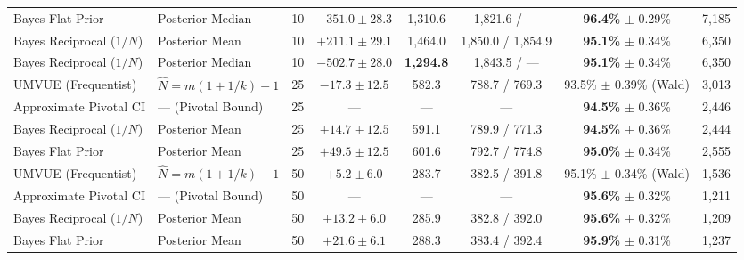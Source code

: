 \documentclass[10pt,a4paper]{article}
\begin{document}
\begin{table}[H]
{\begin{tabular}{llcccccc}
Bayes Flat Prior          & Posterior Median           & 10 & $-351.0 \pm 28.3$ & 1,310.6 & 1,821.6 / ---     & \textbf{96.4\%} $\pm$ 0.29\% & 7,185 \\
Bayes Reciprocal ($1/N$)  & Posterior Mean             & 10 & $+211.1 \pm 29.1$ & 1,464.0 & 1,850.0 / 1,854.9 & \textbf{95.1\%} $\pm$ 0.34\% & 6,350 \\
Bayes Reciprocal ($1/N$)  & Posterior Median           & 10 & $-502.7 \pm 28.0$ & \textbf{1,294.8} & 1,843.5 / ---     & \textbf{95.1\%} $\pm$ 0.34\% & 6,350 \\
\midrule
UMVUE (Frequentist)       & $\hat{N} = m(1 + 1/k) - 1$ & 25 & $-17.3 \pm 12.5$  & 582.3   & 788.7 / 769.3     & 93.5\% $\pm$ 0.39\% (Wald) & 3,013 \\
Approximate Pivotal CI    & --- (Pivotal Bound)        & 25 & ---               & ---     & ---               & \textbf{94.5\%} $\pm$ 0.36\% & 2,446 \\
Bayes Reciprocal ($1/N$)  & Posterior Mean             & 25 & $+14.7 \pm 12.5$  & 591.1   & 789.9 / 771.3     & \textbf{94.5\%} $\pm$ 0.36\% & 2,444 \\
Bayes Flat Prior          & Posterior Mean             & 25 & $+49.5 \pm 12.5$  & 601.6   & 792.7 / 774.8     & \textbf{95.0\%} $\pm$ 0.34\% & 2,555 \\
\midrule
UMVUE (Frequentist)       & $\hat{N} = m(1 + 1/k) - 1$ & 50 & $+5.2 \pm 6.0$    & 283.7   & 382.5 / 391.8     & 95.1\% $\pm$ 0.34\% (Wald) & 1,536 \\
Approximate Pivotal CI    & --- (Pivotal Bound)        & 50 & ---               & ---     & ---               & \textbf{95.6\%} $\pm$ 0.32\% & 1,211 \\
Bayes Reciprocal ($1/N$)  & Posterior Mean             & 50 & $+13.2 \pm 6.0$   & 285.9   & 382.8 / 392.0     & \textbf{95.6\%} $\pm$ 0.32\% & 1,209 \\
Bayes Flat Prior          & Posterior Mean             & 50 & $+21.6 \pm 6.1$   & 288.3   & 383.4 / 392.4     & \textbf{95.9\%} $\pm$ 0.31\% & 1,237 \\
\bottomrule
\end{tabular}}
\end{table}
\end{document}
